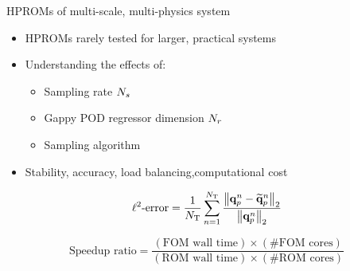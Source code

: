 \documentclass[]{beamer}
\begin{document}
\begin{frame}{HPROMs of multi-scale, multi-physics system}
	\begin{itemize}
		\item HPROMs rarely tested for larger, practical systems
		\item Understanding the effects of:
		\begin{itemize}
			\item Sampling rate $N_s$
			\item Gappy POD regressor dimension $N_r$
			\item Sampling algorithm
		\end{itemize}
		\item Stability, accuracy, load balancing,computational cost
	\end{itemize}

	\begin{equation*}
		\ell^2\text{-error} = \frac{1}{N_{\text{T}}} \sum_{n=1}^{N_{\text{T}}} \frac{\left\Vert \mathbf{q}_{p}^{n} - \mathbf{\widetilde{q}}_{p}^{n} \right\Vert_2}{\left\Vert \mathbf{q}_{p}^{n} \right\Vert_2}
	\end{equation*}

	\begin{equation*}
		\text{Speedup ratio} = \frac{(\text{FOM wall time}) \times (\text{\# FOM cores})}{(\text{ROM wall time}) \times (\text{\# ROM cores})}
	\end{equation*}
\end{frame}
\end{document}
